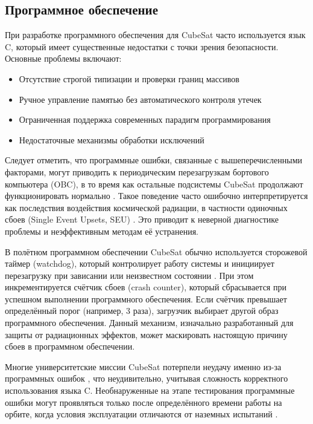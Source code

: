\subsection{Программное обеспечение}
При разработке программного обеспечения для CubeSat часто используется язык C, который имеет существенные недостатки с точки зрения безопасности. Основные проблемы включают:

\begin{itemize}
    \item Отсутствие строгой типизации и проверки границ массивов
    \item Ручное управление памятью без автоматического контроля утечек
    \item Ограниченная поддержка современных парадигм программирования
    \item Недостаточные механизмы обработки исключений
\end{itemize}

Следует отметить, что программные ошибки, связанные с вышеперечисленными факторами, могут приводить к периодическим перезагрузкам бортового компьютера (OBC), в то время как остальные подсистемы CubeSat продолжают функционировать нормально \cite{langer2009reliability}. Такое поведение часто ошибочно интерпретируется как последствия воздействия космической радиации, в частности одиночных сбоев (Single Event Upsets, SEU) \cite{koopman2020edge}. Это приводит к неверной диагностике проблемы и неэффективным методам её устранения.

В полётном программном обеспечении CubeSat обычно используется сторожевой таймер (watchdog), который контролирует работу системы и инициирует перезагрузку при зависании или неизвестном состоянии \cite{kastensmidt2019fault}. При этом инкрементируется счётчик сбоев (crash counter), который сбрасывается при успешном выполнении программного обеспечения. Если счётчик превышает определённый порог (например, 3 раза), загрузчик выбирает другой образ программного обеспечения. Данный механизм, изначально разработанный для защиты от радиационных эффектов, может маскировать настоящую причину сбоев в программном обеспечении.

Многие университетские миссии CubeSat потерпели неудачу именно из-за программных ошибок \cite{guo2014flight}, что неудивительно, учитывая сложность корректного использования языка C. Необнаруженные на этапе тестирования программные ошибки могут проявляться только после определённого времени работы на орбите, когда условия эксплуатации отличаются от наземных испытаний \cite{dubey2009evaluating}.

